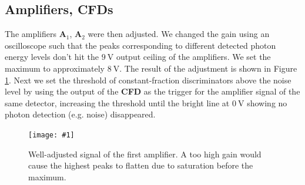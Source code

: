\documentclass[twocolumn]{article}
\newcommand{\insertFigure}[1]{%
   \texttt{[image: \#1]}%
}
\begin{document}
\subsection{Amplifiers, CFDs}
The amplifiers \textbf{A$_1$}, \textbf{A$_2$} were then adjusted. We changed the gain using an oscilloscope such that the peaks corresponding to different detected photon energy levels don't hit the $\SI{9}{\volt}$ output ceiling of the amplifiers. We set the maximum to approximately $\SI{8}{\volt}$. The result of the adjustment is shown in Figure \ref{fig:amp}. Next we set the threshold of constant-fraction discriminators above the noise level by using the output of the \textbf{CFD} as the trigger for the amplifier signal of the same detector, increasing the threshold until the bright line at $\SI{0}{\volt}$ showing no photon detection (e.g. noise) disappeared. 
\begin{figure}[!h]
	\centering
	\insertFigure{./screenshots/SC08_cropped.png}
	\caption{Well-adjusted signal of the first amplifier. A too high gain would cause the highest peaks to flatten due to saturation before the maximum.} 
	\label{fig:amp}
\end{figure}
\end{document}
